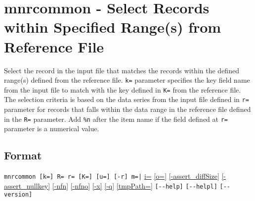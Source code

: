 %

\section{mnrcommon - Select Records within Specified Range(s) from Reference File\label{sect:mnrcommon}}
Select the record in the input file that matches the records within the defined range(s) defined from the reference file.
 \verb|k=| parameter specifies the key field name from the input file to match with the key defined in \verb|K=| from the reference file. The selection criteria is based on the data series from the input file defined in \verb|r=| parameter for records that falls within the data range in the reference file defined in the \verb|R=| parameter. 
Add \verb|%n| after the item name if the field defined at \verb|r=| parameter is a numerical value.  

\subsection*{Format}
\verb/mnrcommon [k=] R= r= [K=] [u=] [-r] m=|/ 
\hyperref[sect:option_i]{i=}
\hyperref[sect:option_o]{[o=]}
\hyperref[sect:option_assert_diffSize]{[-assert\_diffSize]}
\hyperref[sect:option_assert_nullkey]{[-assert\_nullkey]}
\hyperref[sect:option_nfn]{[-nfn]} 
\hyperref[sect:option_nfno]{[-nfno]}  
\hyperref[sect:option_x]{[-x]}
\hyperref[sect:option_q]{[-q]}
\hyperref[sect:option_option_tmppath]{[tmpPath=]}
\verb|[--help]|
\verb|[--helpl]|
\verb|[--version]|\\

